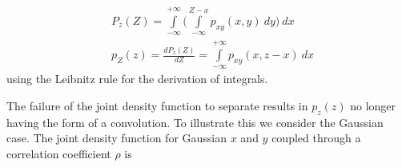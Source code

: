\documentclass{article}
\begin{document}
\begin{equation}
    \begin{split}
        & P_z(Z) = \int\limits_{-\infty}^{+\infty} \Biggl( \int\limits_{-\infty}^{Z-x} p_{xy}(x, y) \> dy \Biggr) \> dx \\
        & p_Z(z) = \frac{dP_z(Z)}{dZ} = \int\limits_{-\infty}^{+\infty} p_{xy}(x, z-x) \> dx
    \end{split}
\end{equation}
using the Leibnitz rule for the derivation of integrals. 

The failure of the joint density function to separate results in $p_z(z)$ no longer having the form of a
convolution. To illustrate this we consider the Gaussian case. The joint density function for Gaussian
$x$ and $y$ coupled through a correlation coefficient $\rho$ is
\end{document}
